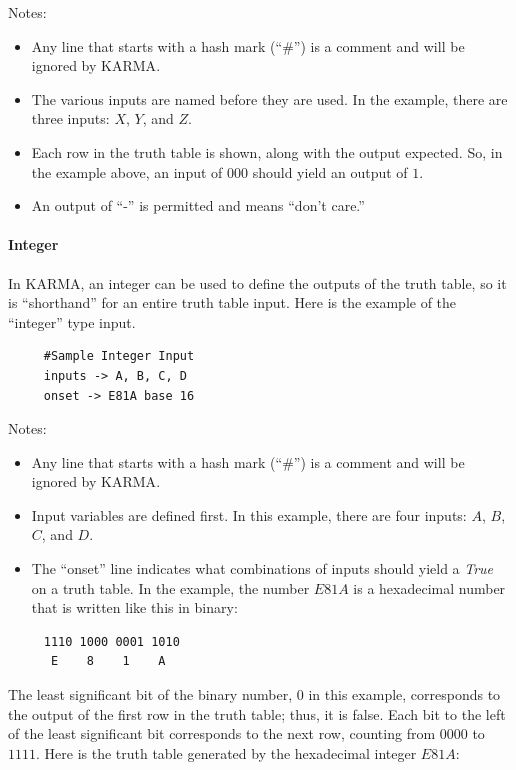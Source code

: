 Notes: 

\begin{itemize}
	\item Any line that starts with a hash mark (``\#'') is a comment and will be ignored by \ac{KARMA}. 
	\item The various inputs are named before they are used. In the example, there are three inputs: $ X $, $ Y $, and $ Z $. 
	\item Each row in the truth table is shown, along with the output expected. So, in the example above, an input of $ 000 $ should yield an output of $ 1 $. 
	\item An output of ``-'' is permitted and means ``don't care.'' 
\end{itemize}

\paragraph{Integer}
\label{ASM:para:karma_integer}

In \ac{KARMA}, an integer can be used to define the outputs of the truth table, so it is ``shorthand'' for an entire truth table input. Here is the example of the ``integer'' type input.

\begin{verbatim}
     #Sample Integer Input
     inputs -> A, B, C, D
     onset -> E81A base 16 
\end{verbatim}

Notes: 

\begin{itemize}
	\item Any line that starts with a hash mark (``\#'') is a comment and will be ignored by \ac{KARMA}. 
	\item Input variables are defined first. In this example, there are four inputs: $ A $, $ B $, $ C $, and $ D $. 
	\item The ``onset'' line indicates what combinations of inputs should yield a \emph{True} on a truth table. In the example, the number $ E81A $ is a hexadecimal number that is written like this in binary: 
\end{itemize}

\begin{verbatim}
     1110 1000 0001 1010
      E    8    1    A 
\end{verbatim}

The least significant bit of the binary number, $ 0 $ in this example, corresponds to the output of the first row in the truth table; thus, it is false. Each bit to the left of the least significant bit corresponds to the next row, counting from $ 0000 $ to $ 1111 $. Here is the truth table generated by the hexadecimal integer $ E81A $: 

